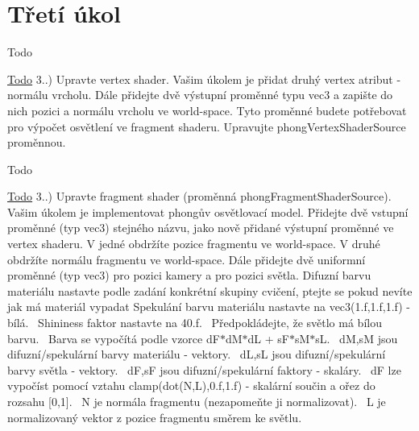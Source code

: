 \hypertarget{group__task3}{}\section{Třetí úkol}
\label{group__task3}
\begin{DoxyRefDesc}{Todo}
\item[\hyperlink{todo__todo000002}{Todo}]3..) Upravte vertex shader. Vašim úkolem je přidat druhý vertex atribut -\/ normálu vrcholu. Dále přidejte dvě výstupní proměnné typu vec3 a zapište do nich pozici a normálu vrcholu ve world-\/space. Tyto proměnné budete potřebovat pro výpočet osvětlení ve fragment shaderu. Upravujte phong\+Vertex\+Shader\+Source proměnnou. \end{DoxyRefDesc}


\begin{DoxyRefDesc}{Todo}
\item[\hyperlink{todo__todo000003}{Todo}]3..) Upravte fragment shader (proměnná phong\+Fragment\+Shader\+Source). Vašim úkolem je implementovat phongův osvětlovací model. Přidejte dvě vstupní proměnné (typ vec3) stejného názvu, jako nově přidané výstupní proměnné ve vertex shaderu. V jedné obdržíte pozice fragmentu ve world-\/space. V druhé obdržíte normálu fragmentu ve world-\/space. Dále přidejte dvě uniformní proměnné (typ vec3) pro pozici kamery a pro pozici světla. Difuzní barvu materiálu nastavte podle zadání konkrétní skupiny cvičení, ptejte se pokud nevíte jak má materiál vypadat Spekulání barvu materiálu nastavte na vec3(1.\+f,1.\+f,1.\+f) -\/ bílá.~\newline
 Shininess faktor nastavte na 40.\+f.~\newline
 Předpokládejte, že světlo má bílou barvu.~\newline
 Barva se vypočítá podle vzorce d\+F$\ast$d\+M$\ast$d\+L + s\+F$\ast$s\+M$\ast$s\+L.~\newline
 d\+M,s\+M jsou difuzní/spekulární barvy materiálu -\/ vektory.~\newline
 d\+L,s\+L jsou difuzní/spekulární barvy světla -\/ vektory.~\newline
 d\+F,s\+F jsou difuzní/spekulární faktory -\/ skaláry.~\newline
 d\+F lze vypočíst pomocí vztahu clamp(dot(\+N,\+L),0.\+f,1.\+f) -\/ skalární součin a ořez do rozsahu \mbox{[}0,1\mbox{]}.~\newline
 N je normála fragmentu (nezapomeňte ji normalizovat).~\newline
 L je normalizovaný vektor z pozice fragmentu směrem ke světlu.~\newline

\end{DoxyRefDesc}
